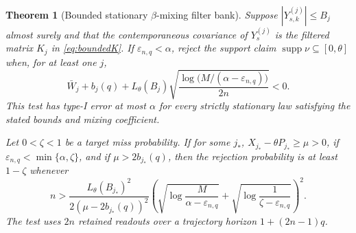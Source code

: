\documentclass[11pt]{article}
\newtheorem{theorem}{Theorem}[section]
\theoremstyle{definition}
\theoremstyle{remark}
\newcommand{\supp}{\operatorname{supp}}
\begin{document}
\begin{theorem}[Bounded stationary $\beta$-mixing filter bank]
\label{thm:mixing}
Suppose $|Y_{s,k}^{(j)}|\leq B_j$ almost surely and that the contemporaneous
covariance of $Y_s^{(j)}$ is the filtered matrix $K_j$ in
\eqref{eq:boundedK}.  If $\varepsilon_{n,q}<\alpha$, reject the support claim
$\supp\nu\subseteq[0,\theta]$ when, for at least one $j$,
\begin{equation}
 \bar W_j+b_j(q)+L_\theta(B_j)
 \sqrt{\frac{\log\!\bigl(M/(\alpha-\varepsilon_{n,q})\bigr)}{2n}}<0.
                                                               \label{eq:mixtest}
\end{equation}
This test has type-I error at most $\alpha$ for every strictly stationary law
satisfying the stated bounds and mixing coefficient.

Let $0<\zeta<1$ be a target miss probability.  If for some $j_*$,
$X_{j_*}-\theta P_{j_*}\geq\mu>0$, if
$\varepsilon_{n,q}<\min\{\alpha,\zeta\}$, and if
$\mu>2b_{j_*}(q)$, then the rejection probability is at least $1-\zeta$
whenever
\begin{equation}
 n>
 \frac{L_\theta(B_{j_*})^2}{2(\mu-2b_{j_*}(q))^2}
 \left(
  \sqrt{\log\frac{M}{\alpha-\varepsilon_{n,q}}}
  +\sqrt{\log\frac1{\zeta-\varepsilon_{n,q}}}
 \right)^2.                                               \label{eq:mixpower}
\end{equation}
The test uses $2n$ retained readouts over a trajectory horizon
$1+(2n-1)q$.
\end{theorem}
\end{document}
